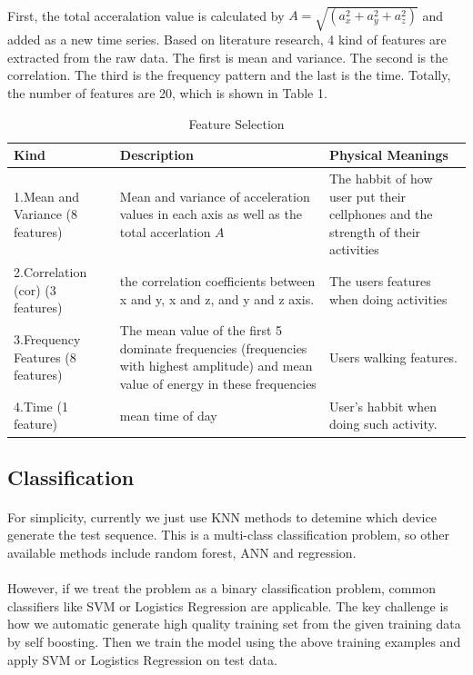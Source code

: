 \documentclass{article}
\begin{document}
		\paragraph{}First, the total acceralation value is calculated by $A=\sqrt{(a_x^2+a_y^2+a_z^2)}$ and added as a new time series. Based on literature research, 4 kind of features are extracted from the raw data. The first is mean and variance. The second is the correlation. The third is the frequency pattern and the last is the time. Totally, the number of features are 20, which is shown in Table 1. 
		\begin{table}
			\centering
			\caption{Feature Selection}
			\begin{tabular}{p{3cm}|p{6cm}|p{4cm}}
			Kind & Description & Physical Meanings \\ \hline
			1.Mean and Variance (8 features) & Mean and variance of acceleration values in each axis as well as the total accerlation $A$ & The habbit of how user put their cellphones and the strength of their activities \\ \hline
			2.Correlation (cor) (3 features) & the correlation coefficients between x and y, x and z, and y and z axis. & The users features when doing activities \\ \hline
			3.Frequency Features (8 features) & The mean value of the first 5 dominate frequencies (frequencies with highest amplitude) and mean value of energy in these frequencies & Users walking features.\\ \hline
			4.Time (1 feature) & mean time of day & User's habbit when doing such activity.
			\end{tabular}
		\end{table}

	
		\subsection{Classification} %
		\label{sub:classifier}
		\paragraph{} For simplicity, currently we just use KNN methods to detemine which device generate the test sequence. This is a multi-class classification problem, so other available methods include random forest, ANN and regression. 
		
		\paragraph{} However, if we treat the problem as a binary classification problem, common classifiers like SVM or Logistics Regression are applicable. The key challenge is how we automatic generate high quality training set from the given training data by self boosting. Then we train the model using the above training examples and apply SVM or Logistics Regression on test data.
	
\end{document}
